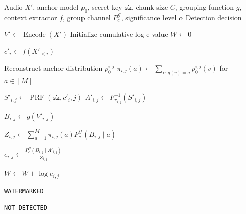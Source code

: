 \documentclass[12pt]{article}
\newcommand{\sk}{\texttt{sk}}
\theoremstyle{plain}
\theoremstyle{definition}
\begin{document}
\begin{algorithm}[H]
\caption{Watermark Detection}
\label{alg:watermark_detection}
\begin{algorithmic}[1]
\Require Audio $X'$, anchor model $p_0$,
    secret key $\sk$, chunk size $C$,
    grouping function $g$, context extractor $f$,
    group channel $P_c^{\mathcal G}$,
    significance level $\alpha$
\Ensure Detection decision

\State $V'\gets\operatorname{Encode}(X')$
\State Initialize cumulative log e-value $W\gets 0$

    \State $c'_i\gets f(X'_{<i})$

        \State Reconstruct anchor distribution $p_0^{i,j}$
        \State $\pi_{i,j}(a)\gets
            \sum_{v:g(v)=a}p_0^{i,j}(v)$
            for $a\in[M]$

        \State $S'_{i,j}\gets
            \operatorname{PRF}(\sk,c'_i,j)$
        \State $A'_{i,j}\gets
            F^{-1}_{\pi_{i,j}}(S'_{i,j})$

        \State $B_{i,j}\gets g(V'_{i,j})$

        \State $Z_{i,j}\gets
            \sum_{a=1}^{M}\pi_{i,j}(a)
            P_c^{\mathcal G}(B_{i,j}\mid a)$

        \State $e_{i,j}\gets
            \frac{P_c^{\mathcal G}(B_{i,j}\mid A'_{i,j})}
            {Z_{i,j}}$

        \State $W\gets W+\log e_{i,j}$

            \State \Return \texttt{WATERMARKED}
        \EndIf
    \EndFor
\EndFor

\State \Return \texttt{NOT DETECTED}
\end{algorithmic}
\end{algorithm}
\end{document}
